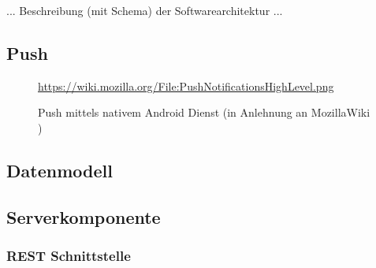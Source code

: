 ... Beschreibung (mit Schema) der Softwarearchitektur ...

\subsection{Push}

\begin{figure}[htp] 
\caption{Push mittels nativem Android Dienst (in Anlehnung an MozillaWiki \cite{MOZ_WIKI})}
\quelle\url{https://wiki.mozilla.org/File:PushNotificationsHighLevel.png}
\label{image_architektur-android-push}
\end{figure}  

\subsection{Datenmodell}
\label{subsec_datenmodell}



\subsection{Serverkomponente}
\label{subsec_serverkomponente}

\subsubsection{REST Schnittstelle}

